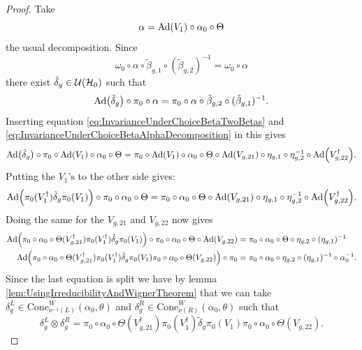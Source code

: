 \documentclass[11pt,a4paper,twoside]{article}
\numberwithin{equation}{section}
\begin{document}
	\begin{proof}
		Take 
		\begin{equation}\label{eq:InvarianceUnderChoiceBetaAlphaDecomposition}
			\alpha=\Ad{V_1}\circ\alpha_{0}\circ\Theta
		\end{equation}
		the usual decomposition. Since
		\begin{equation}
			\omega_0\circ\alpha\circ\tilde{\beta}_{g,1}\circ(\tilde{\beta}_{g,2})^{-1}=\omega_0\circ\alpha
		\end{equation}
		there exist $\tilde{\delta}_g\in\mathcal U(\mathcal H_0)$ such that
		\begin{equation}
			\Ad{\tilde{\delta}_g}\circ\pi_0\circ\alpha=\pi_0\circ\alpha\circ\tilde{\beta}_{g,2}\circ(\tilde{\beta}_{g,1})^{-1}.
		\end{equation}
		Inserting equation \eqref{eq:InvarianceUnderChoiceBetaTwoBetas} and \eqref{eq:InvarianceUnderChoiceBetaAlphaDecomposition} in this gives
		\begin{equation}
			\Ad{\tilde{\delta}_g}\circ\pi_0\circ\Ad{V_1}\circ\alpha_0\circ\Theta=\pi_0\circ\Ad{V_1}\circ\alpha_0\circ\Theta\circ\Ad{V_{g,21}}\circ\eta_{g,1}\circ\eta_{g,2}^{-1}\circ\Ad{V_{g,22}^\dagger}.
		\end{equation}
		Putting the $V_1$'s to the other side gives:
		\begin{equation}
			\Ad{\pi_0(V_1^\dagger) \tilde{\delta}_g\pi_0(V_1)}\circ\pi_0\circ\alpha_0\circ\Theta=\pi_0\circ\alpha_0\circ\Theta\circ\Ad{V_{g,21}}\circ\eta_{g,1}\circ\eta_{g,2}^{-1}\circ\Ad{V_{g,22}^\dagger}.
		\end{equation}
		Doing the same for the $V_{g,21}$ and $V_{g,22}$ now gives
		\begin{align}
			\Ad{\pi_0\circ\alpha_0\circ\Theta(V_{g,21}^\dagger)\pi_0(V_1^\dagger)\tilde{\delta}_g\pi_0(V_1)}\circ\pi_0\circ\alpha_0\circ\Theta\circ\Ad{V_{g,22}}&=\pi_0\circ\alpha_0\circ\Theta\circ\eta_{g,2}\circ(\eta_{g,1})^{-1}\\
			\Ad{\pi_0\circ\alpha_0\circ\Theta(V_{g,21}^\dagger)\pi_0(V_1^\dagger)\tilde{\delta}_g\pi_0(V_1)\pi_0\circ\alpha_0\circ\Theta(V_{g,22})}\circ\pi_0&=\pi_0\circ\alpha_0\circ\eta_{g,2}\circ(\eta_{g,1})^{-1}\circ\alpha_0^{-1}.
		\end{align}
		Since the last equation is split we have by lemma \ref{lem:UsingIrreducibilityAndWignerTheorem} that we can take $\delta_g^L\in\textrm{Cone}_{\nu^{-1}(L)}^W(\alpha_0,\theta)$ and $\delta_g^R\in\textrm{Cone}_{\nu(R)}^W(\alpha_0,\theta)$ such that
		\begin{equation}
			\delta_g^L\otimes\delta_g^R=\pi_0\circ\alpha_0\circ\Theta(V_{g,21}^\dagger)\pi_0(V_1^\dagger)\tilde{\delta}_g\pi_0(V_1)\pi_0\circ\alpha_0\circ\Theta(V_{g,22}).

\end{equation}
\end{proof}
\end{document}
